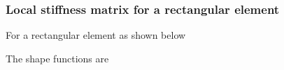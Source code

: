 \subsubsection*{Local stiffness matrix for a rectangular element}
For a rectangular element as shown below

\begin{center}
  
\end{center}

\newcommand{\shpf}{shape functions}
The \shpf{} are
\newcommand{\Ni}[1]{\ensuremath{N_i(x,y)}}
\newcommand{\Nij}[2]{\dX[#2]{N_{#1}}}
\def\g#1{\ensuremath{g_{#1}(y)}}
\def\f#1{\ensuremath{f_{#1}(x)}}
\newcommand{\vg}{
  \begin{bmatrix}
    \g2 \\ \g1
  \end{bmatrix}
}

